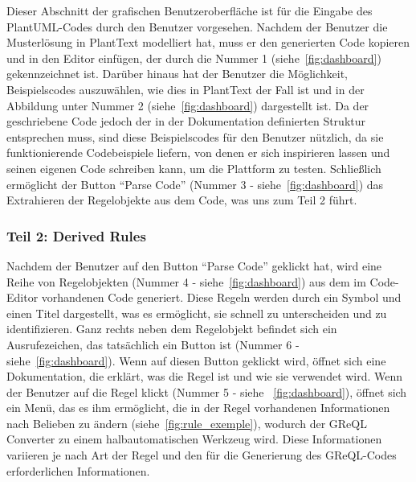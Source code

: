 Dieser Abschnitt der grafischen Benutzeroberfläche ist für die Eingabe des PlantUML-Codes durch den Benutzer vorgesehen.
Nachdem der Benutzer die Musterlösung in PlantText modelliert hat, muss er den generierten Code kopieren und in den
Editor einfügen, der durch die Nummer 1 (siehe~\ref{fig:dashboard}) gekennzeichnet ist. Darüber hinaus hat der Benutzer die
Möglichkeit, Beispielscodes auszuwählen, wie dies in PlantText der Fall ist und in der Abbildung unter Nummer 2 (siehe~\ref{fig:dashboard})
dargestellt ist. Da der geschriebene Code jedoch der in der Dokumentation definierten Struktur entsprechen muss, sind
diese Beispielscodes für den Benutzer nützlich, da sie funktionierende Codebeispiele liefern, von denen er sich
inspirieren lassen und seinen eigenen Code schreiben kann, um die Plattform zu testen. Schließlich ermöglicht der
Button ``Parse Code'' (Nummer 3 - siehe~\ref{fig:dashboard}) das Extrahieren der Regelobjekte aus dem Code, was uns zum
Teil 2 führt.

\subsubsection{Teil 2: Derived Rules}

Nachdem der Benutzer auf den Button ``Parse Code'' geklickt hat, wird eine Reihe von Regelobjekten
(Nummer 4 - siehe~\ref{fig:dashboard}) aus dem im Code-Editor vorhandenen Code generiert. Diese Regeln werden durch ein
Symbol und einen Titel dargestellt, was es ermöglicht, sie schnell zu unterscheiden und zu identifizieren. Ganz rechts
neben dem Regelobjekt befindet sich ein Ausrufezeichen, das tatsächlich ein Button ist (Nummer 6 - siehe~\ref{fig:dashboard}).
Wenn auf diesen Button geklickt wird, öffnet sich eine Dokumentation, die erklärt, was die Regel ist und wie sie
verwendet wird. Wenn der Benutzer auf die Regel klickt (Nummer 5 - siehe ~\ref{fig:dashboard}), öffnet sich ein Menü,
das es ihm ermöglicht, die in der Regel vorhandenen Informationen nach Belieben zu ändern (siehe~\ref{fig:rule_exemple}),
wodurch der \gls{GReQL Converter} zu einem halbautomatischen Werkzeug wird. Diese Informationen variieren je nach Art der Regel
und den für die Generierung des GReQL-Codes erforderlichen Informationen.

